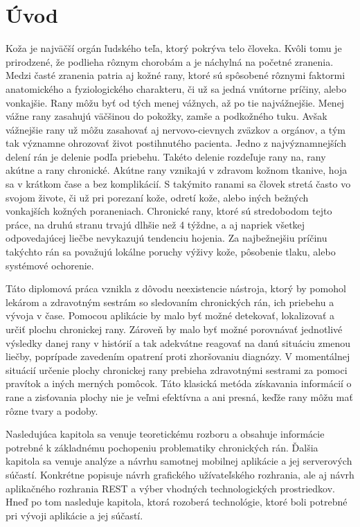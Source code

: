 \chapter{Úvod}
Koža je najväčší orgán ľudského teľa, ktorý pokrýva telo človeka. Kvôli tomu je prirodzené, že podlieha rôznym chorobám a je náchylná na početné zranenia. Medzi časté zranenia patria aj kožné rany, ktoré sú spôsobené rôznymi faktormi anatomického a fyziologického charakteru, či už sa jedná vnútorne príčiny, alebo vonkajšie. Rany môžu byť od tých menej vážnych, až po tie najvážnejšie. Menej vážne rany zasahujú väčšinou do pokožky, zamše a podkožného tuku. Avšak vážnejšie rany už môžu zasahovať aj nervovo-cievnych zväzkov a orgánov, a tým tak významne ohrozovať život postihnutého pacienta. Jedno z najvýznamnejších delení rán je delenie podľa priebehu. Takéto delenie rozdeľuje rany na, rany akútne a rany chronické. Akútne rany vznikajú v zdravom kožnom tkanive, hoja sa v krátkom čase a bez komplikácií. S takýmito ranami sa človek stretá často vo svojom živote, či už pri porezaní kože, odretí kože, alebo iných bežných vonkajších kožných poraneniach. Chronické rany, ktoré sú stredobodom tejto práce, na druhú stranu trvajú dlhšie než 4 týždne, a aj napriek všetkej odpovedajúcej liečbe nevykazujú tendenciu hojenia. Za najbežnejšiu príčinu takýchto rán sa považujú lokálne poruchy výživy kože, pôsobenie tlaku, alebo systémové ochorenie. 

Táto diplomová práca vznikla z dôvodu neexistencie nástroja, ktorý by pomohol lekárom a zdravotným sestrám so sledovaním chronických rán, ich priebehu a vývoja v čase. Pomocou aplikácie by malo byť možné detekovať, lokalizovať a určiť plochu chronickej rany. Zároveň by malo byť možné porovnávať jednotlivé výsledky danej rany v histórií a tak adekvátne reagovať na danú situáciu zmenou liečby, poprípade zavedením opatrení proti zhoršovaniu diagnózy. V momentálnej situácií určenie plochy chronickej rany prebieha zdravotnými sestrami za pomoci pravítok a iných merných pomôcok. Táto klasická metóda získavania informácií o rane a zisťovania plochy nie je veľmi efektívna a ani presná, keďže rany môžu mať rôzne tvary a podoby.
	
Nasledujúca kapitola sa venuje teoretickému rozboru a obsahuje informácie potrebné k základnému pochopeniu problematiky chronických rán. Ďalšia kapitola sa venuje analýze a návrhu samotnej mobilnej aplikácie a jej serverových súčastí. Konkrétne popisuje návrh grafického užívateľského rozhrania, ale aj návrh aplikačného rozhrania REST a výber vhodných technologických prostriedkov. Hneď po tom nasleduje kapitola, ktorá rozoberá technológie, ktoré boli potrebné pri vývoji aplikácie a jej súčastí.
